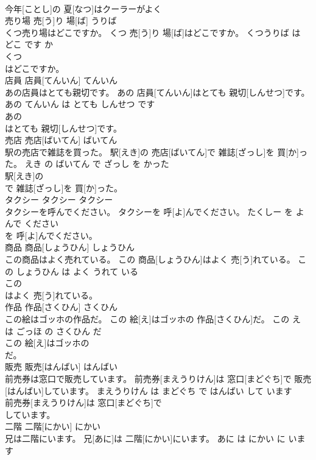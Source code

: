 \documentclass[8pt]{extreport}
\begin{document}
\begin{CJK}{UTF8}{min}
\\	今年[ことし]の 夏[なつ]はクーラーがよく
\\	売り場	売[う]り 場[ば]	うりば	
\\	くつ売り場はどこですか。	くつ 売[う]り 場[ば]はどこですか。	くつうりば は どこ です か	
\\	くつ
\\	はどこですか。			
\\	店員	店員[てんいん]	てんいん	
\\	あの店員はとても親切です。	あの 店員[てんいん]はとても 親切[しんせつ]です。	あの てんいん は とても しんせつ です	
\\	あの
\\	はとても 親切[しんせつ]です。			
\\	売店	売店[ばいてん]	ばいてん	
\\	駅の売店で雑誌を買った。	駅[えき]の 売店[ばいてん]で 雑誌[ざっし]を 買[か]った。	えき の ばいてん で ざっし を かった	
\\	駅[えき]の
\\	で 雑誌[ざっし]を 買[か]った。			
\\	タクシー	タクシー	タクシー	
\\	タクシーを呼んでください。	タクシーを 呼[よ]んでください。	たくしー を よんで ください	
\\	を 呼[よ]んでください。			
\\	商品	商品[しょうひん]	しょうひん	
\\	この商品はよく売れている。	この 商品[しょうひん]はよく 売[う]れている。	この しょうひん は よく うれて いる	
\\	この
\\	はよく 売[う]れている。			
\\	作品	作品[さくひん]	さくひん	
\\	この絵はゴッホの作品だ。	この 絵[え]はゴッホの 作品[さくひん]だ。	この え は ごっほ の さくひん だ	
\\	この 絵[え]はゴッホの
\\	だ。			
\\	販売	販売[はんばい]	はんばい	
\\	前売券は窓口で販売しています。	前売券[まえうりけん]は 窓口[まどぐち]で 販売[はんばい]しています。	まえうりけん は まどぐち で はんばい して います	
\\	前売券[まえうりけん]は 窓口[まどぐち]で
\\	しています。			
\\	二階	二階[にかい]	にかい	
\\	兄は二階にいます。	兄[あに]は 二階[にかい]にいます。	あに は にかい に います	

\end{CJK}
\end{document}
